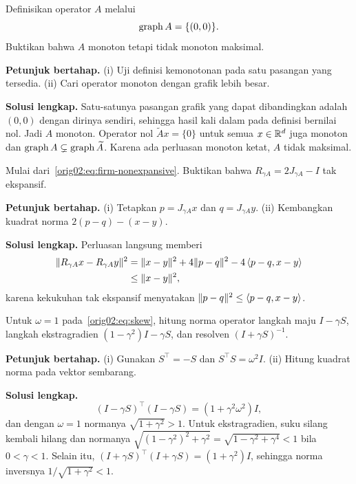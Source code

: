 \begin{exercise}
  \label{orig02:exercise:nonmaximal}
  Definisikan operator $A$ melalui
  \begin{equation}
    \operatorname{\mathrm{graph}} A=\{(0,0)\}.
  \end{equation}
  Buktikan bahwa $A$ monoton tetapi tidak monoton maksimal.

  \textbf{Petunjuk bertahap.}
  (i) Uji definisi kemonotonan pada satu pasangan yang tersedia.
  (ii) Cari operator monoton dengan grafik lebih besar.

  \textbf{Solusi lengkap.}
  Satu-satunya pasangan grafik yang dapat dibandingkan adalah $(0,0)$ dengan
  dirinya sendiri, sehingga hasil kali dalam pada definisi bernilai nol.
  Jadi $A$ monoton. Operator nol $\widetilde A x=\{0\}$ untuk semua
  $x\in\mathbb{R}^d$ juga monoton dan
  $\operatorname{\mathrm{graph}} A\subsetneq\operatorname{\mathrm{graph}}\widetilde A$. Karena ada perluasan monoton ketat,
  $A$ tidak maksimal.
\end{exercise}

\begin{exercise}
  \label{orig02:exercise:resolvent-reflection}
  Mulai dari~\eqref{orig02:eq:firm-nonexpansive}. Buktikan bahwa
  $R_{\gamma A}=2J_{\gamma A}-I$ tak ekspansif.

  \textbf{Petunjuk bertahap.}
  (i) Tetapkan $p=J_{\gamma A}x$ dan $q=J_{\gamma A}y$.
  (ii) Kembangkan kuadrat norma $2(p-q)-(x-y)$.

  \textbf{Solusi lengkap.}
  Perluasan langsung memberi
  \begin{equation}
  \begin{aligned}
    \|R_{\gamma A}x-R_{\gamma A}y\|^2
    &=\|x-y\|^2+4\|p-q\|^2-4\left\langle p-q , x-y\right\rangle\\
    &\leq\|x-y\|^2,
  \end{aligned}
  \end{equation}
  karena kekukuhan tak ekspansif menyatakan
  $\|p-q\|^2\leq\left\langle p-q , x-y\right\rangle$.
\end{exercise}

\begin{exercise}
  \label{orig02:exercise:skew}
  Untuk $\omega=1$ pada~\eqref{orig02:eq:skew}, hitung norma operator
  langkah maju $I-\gamma S$, langkah ekstragradien
  $(1-\gamma^2)I-\gamma S$, dan resolven $(I+\gamma S)^{-1}$.

  \textbf{Petunjuk bertahap.}
  (i) Gunakan $S^\top=-S$ dan $S^\top S=\omega^2I$.
  (ii) Hitung kuadrat norma pada vektor sembarang.

  \textbf{Solusi lengkap.}
  \begin{equation}
    (I-\gamma S)^\top(I-\gamma S)
    =(1+\gamma^2\omega^2)I,
  \end{equation}
  dan dengan $\omega=1$ normanya $\sqrt{1+\gamma^2}>1$. Untuk
  ekstragradien, suku silang kembali hilang dan normanya
  $\sqrt{(1-\gamma^2)^2+\gamma^2}
   =\sqrt{1-\gamma^2+\gamma^4}<1$ bila $0<\gamma<1$. Selain itu,
  $(I+\gamma S)^\top(I+\gamma S)=(1+\gamma^2)I$, sehingga
  norma inversnya $1/\sqrt{1+\gamma^2}<1$.
\end{exercise}

